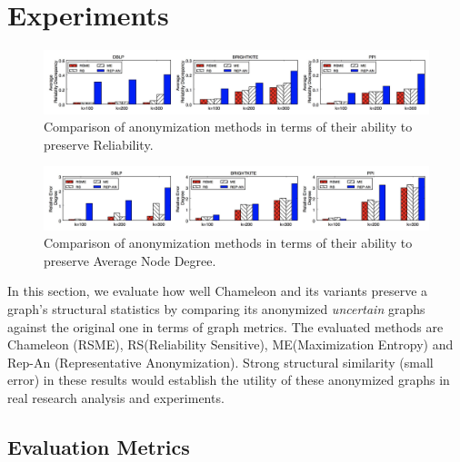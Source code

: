\section{Experiments}
\label{sec:exp}
\begin{figure}[!htb]
    \centering
    \includegraphics[width=\linewidth]{exp/exp_rel.jpg}
    \caption{Comparison of anonymization methods in terms of their ability to preserve Reliability.}
    \label{fig:ex_degree}
\end{figure}
\begin{figure}[!htb]
    \centering
    \includegraphics[width=\linewidth]{exp/exp_degree.jpg}
    \caption{Comparison of anonymization methods in terms of their ability to preserve Average Node Degree.}
    \label{fig:ex_degree}
\end{figure}

In this section, we evaluate how well Chameleon and its variants preserve a graph's structural statistics by comparing its anonymized \emph{uncertain} graphs against the original one in terms of graph metrics. The evaluated methods are Chameleon (RSME), RS(Reliability Sensitive), ME(Maximization Entropy) and Rep-An (Representative Anonymization).
Strong structural similarity (small error) in these results would establish the utility of these anonymized graphs in real research analysis and experiments. 

\subsection{Evaluation Metrics}

